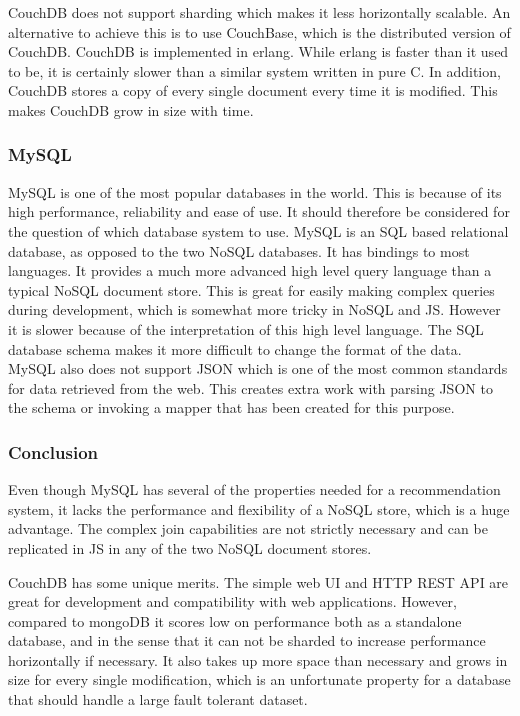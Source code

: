 CouchDB does not support sharding which makes it less horizontally scalable. An alternative to achieve this is to use CouchBase, which is the distributed version of CouchDB. CouchDB is implemented in erlang. While erlang is faster than it used to be, it is certainly slower than a similar system written in pure C. In addition, CouchDB stores a copy of every single document every time it is modified. This makes CouchDB grow in size with time.
\cite{couchdb-about, couchdb-technical}


\subsubsection*{MySQL}
MySQL is one of the most popular databases in the world. This is because of its high performance, reliability and ease of use. It should therefore be considered for the question of which database system to use. MySQL is an SQL based relational database, as opposed to the two NoSQL databases. It has bindings to most languages. It provides a much more advanced high level query language than a typical NoSQL document store. This is great for easily making complex queries during development, which is somewhat more tricky in NoSQL and JS. However it is slower because of the interpretation of this high level language. The SQL database schema makes it more difficult to change the format of the data. MySQL also does not support JSON which is one of the most common standards for data retrieved from the web. This creates extra work with parsing JSON to the schema or invoking a mapper that has been created for this purpose.
\cite{mysql-about}


\subsubsection{Conclusion}
Even though MySQL has several of the properties needed for a recommendation system, it lacks the performance and flexibility of a NoSQL store, which is a huge advantage. The complex join capabilities are not strictly necessary and can be replicated in JS in any of the two NoSQL document stores.

CouchDB has some unique merits. The simple web UI and HTTP REST API are great for development and compatibility with web applications. However, compared to mongoDB it scores low on performance both as a standalone database, and in the sense that it can not be sharded to increase performance horizontally if necessary. It also takes up more space than necessary and grows in size for every single modification, which is an unfortunate property for a database that should handle a large fault tolerant dataset.

